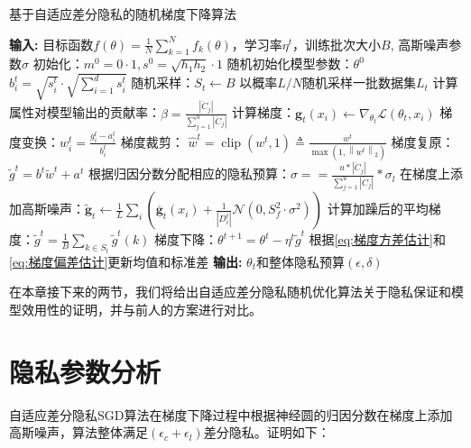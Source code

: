 \begin{algorithm}[!htb]
	\caption{基于自适应差分隐私的随机梯度下降算法}
	\label{基于自适应差分隐私的随机梯度下降算法}
	\begin{algorithmic}[1]
		\footnotesize
		\STATE \textbf{输入:} 目标函数$f(\theta)=\frac{1}{N} \sum_{k=1}^{N} f_{k}(\theta)$，学习率$\eta^{t}$，训练批次大小$B$, 高斯噪声参数$\sigma$ 
		\STATE 初始化：$m^{0}=0 \cdot 1, s^{0}=\sqrt{h_{1} h_{2}} \cdot 1$
		\STATE 随机初始化模型参数：$\theta^{0}$
				\STATE $b_{i}^{t}=\sqrt{s_{i}^{t}} \cdot \sqrt{\sum_{i=1}^{d} s_{i}^{t}}$
			\ENDFOR
			\STATE 随机采样：$S_{t} \leftarrow B$
				\STATE 以概率$L / N$随机采样一批数据集$L_{t}$
				\STATE 计算属性对模型输出的贡献率：$\beta=\frac{\left|\ddot{C}_{j}\right|}{\sum_{j=1}^{u}\left|\ddot{C}_{j}\right|}$
				\STATE 计算梯度：$\mathbf{g}_{t}\left(x_{i}\right) \leftarrow \nabla_{\theta_{t}} \mathcal{L}\left(\theta_{t}, x_{i}\right)$
				\STATE 梯度变换：$w_{i}^{t}=\frac{g_{i}^{t}-a_{i}^{t}}{b_{i}^{t}}$
				\STATE 梯度裁剪： $\hat{w}^{t}=\operatorname{clip}\left(w^{t}, 1\right) \triangleq \frac{w^{t}}{\max \left(1,\left\|w^{t}\right\|_{2}\right)}$
				\STATE 梯度复原： $\tilde{g}^{t}=b^{t} \tilde{w}^{t}+a^{t}$
				\STATE 根据归因分数分配相应的隐私预算：$\sigma==\frac{u *\left|\ddot{C}_{j}\right|}{\sum_{j=1}^{u}\left|\ddot{C}_{j}\right|} * \sigma_{l}$
				\STATE 在梯度上添加高斯噪声：$\tilde{\mathbf{g}}_{t} \leftarrow \frac{1}{L} \sum_{i}\left(\overline{\mathbf{g}}_{t}\left(x_{i}\right)+\frac{1}{\left|D_{i}^{t}\right|}\mathcal{N}\left(0, S_{f}^{2} \cdot \sigma^{2}\right)\right)$
			\ENDFOR
			\STATE 计算加躁后的平均梯度：$\tilde{g}^{t}=\frac{1}{B} \sum_{k \in S_{t}} \tilde{g}^{t}(k)$
			\STATE 梯度下降：$\theta^{t+1}=\theta^{t}-\eta^{t} \tilde{g}^{t}$
			\STATE 根据\ref{eq:梯度方差估计}和\ref{eq:梯度偏差估计}更新均值和标准差
		\ENDFOR
		\STATE \textbf{输出:} $\theta_{t}$和整体隐私预算$(\epsilon, \delta)$
	\end{algorithmic}
\end{algorithm}

在本章接下来的两节，我们将给出自适应差分隐私随机优化算法关于隐私保证和模型效用性的证明，并与前人的方案进行对比。

\section{隐私参数分析}

自适应差分隐私SGD算法在梯度下降过程中根据神经圆的归因分数在梯度上添加高斯噪声，算法整体满足$\left(\epsilon_{c}+\epsilon_{l}\right)$差分隐私。证明如下：


